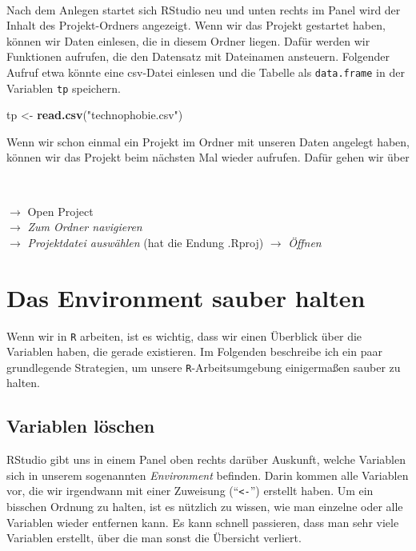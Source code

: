 \documentclass[12pt,]{tufte-book}
\newenvironment{Shaded}{\begin{snugshade}}{\end{snugshade}}
\newcommand{\KeywordTok}[1]{\textcolor[rgb]{0.13,0.29,0.53}{\textbf{#1}}}
\newcommand{\StringTok}[1]{\textcolor[rgb]{0.31,0.60,0.02}{#1}}
\newcommand{\NormalTok}[1]{#1}
\theoremstyle{definition}
\theoremstyle{definition}
\theoremstyle{definition}
\theoremstyle{remark}
\begin{document}
~

Nach dem Anlegen startet sich RStudio neu und unten rechts im Panel wird
der Inhalt des Projekt-Ordners angezeigt. Wenn wir das Projekt gestartet
haben, können wir Daten einlesen, die in diesem Ordner liegen. Dafür
werden wir Funktionen aufrufen, die den Datensatz mit Dateinamen
ansteuern. Folgender Aufruf etwa könnte eine csv-Datei einlesen und die
Tabelle als \texttt{data.frame} in der Variablen \texttt{tp} speichern.

\begin{Shaded}
\begin{Highlighting}[]
\NormalTok{tp <-}\StringTok{ }\KeywordTok{read.csv}\NormalTok{(}\StringTok{"technophobie.csv"}\NormalTok{)}
\end{Highlighting}
\end{Shaded}

Wenn wir schon einmal ein Projekt im Ordner mit unseren Daten angelegt
haben, können wir das Projekt beim nächsten Mal wieder aufrufen. Dafür
gehen wir über

~

\(\to\) Open Project\\
\(\to\) \emph{Zum Ordner navigieren}\\
\(\to\) \emph{Projektdatei auswählen} (hat die Endung .Rproj) \(\to\)
\emph{Öffnen}

\section{Das Environment sauber
halten}\label{das-environment-sauber-halten}

Wenn wir in \texttt{R} arbeiten, ist es wichtig, dass wir einen
Überblick über die Variablen haben, die gerade existieren. Im Folgenden
beschreibe ich ein paar grundlegende Strategien, um unsere
\texttt{R}-Arbeitsumgebung einigermaßen sauber zu halten.

\subsection{Variablen löschen}\label{variablen-luxf6schen}

RStudio gibt uns in einem Panel oben rechts darüber Auskunft, welche
Variablen sich in unserem sogenannten \emph{Environment} befinden. Darin
kommen alle Variablen vor, die wir irgendwann mit einer Zuweisung
(``\texttt{\textless{}-}'') erstellt haben. Um ein bisschen Ordnung zu
halten, ist es nützlich zu wissen, wie man einzelne oder alle Variablen
wieder entfernen kann. Es kann schnell passieren, dass man sehr viele
Variablen erstellt, über die man sonst die Übersicht verliert.
\end{document}
